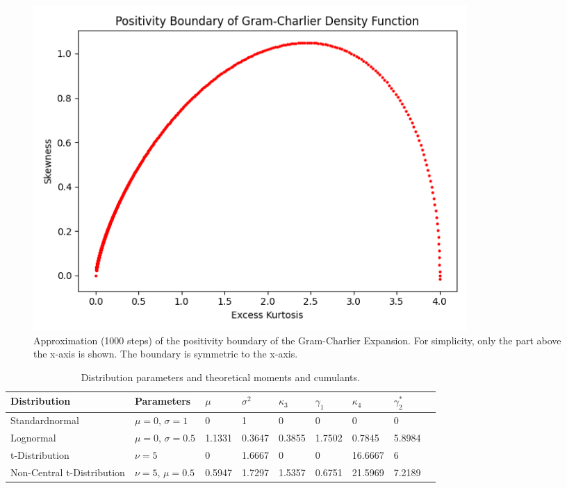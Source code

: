 \begin{figure}[h]
    \centering
    \includegraphics[width=0.8\textwidth]{img/gc_positivity_boundary.png}
    \caption{Approximation (1000 steps) of the positivity boundary of the Gram-Charlier Expansion. For simplicity, only the part above the x-axis is shown. The boundary is symmetric to the x-axis.}
    \label{fig:gram_charlier_boundary}
\end{figure}

\begin{table}[h]
    \centering
    \begin{tabular}{l|l|l|l|l|l|l|l|l}
        Distribution & Parameters & $\mu$ & $\sigma^2$ & $\kappa_3$ & $\gamma_1$ & $\kappa_4$ & $\gamma_2^*$ \\
        \hline
        Standardnormal & $\mu=0$, $\sigma=1$ & 0 & 1 & 0 & 0 & 0 & 0 \\
        Lognormal & $\mu=0$, $\sigma = 0.5$ & 1.1331 & 0.3647 & 0.3855 & 1.7502 & 0.7845 & 5.8984 \\
        t-Distribution & $\nu=5$ & 0 & 1.6667 & 0 & 0 & 16.6667 & 6 \\
        Non-Central t-Distribution & $\nu=5$, $\mu=0.5$ & 0.5947 & 1.7297 & 1.5357 & 0.6751 & 21.5969 & 7.2189
    \end{tabular}
    \caption{Distribution parameters and theoretical moments and cumulants.}
    \label{table:distributions_theoretical_moments}
\end{table}

